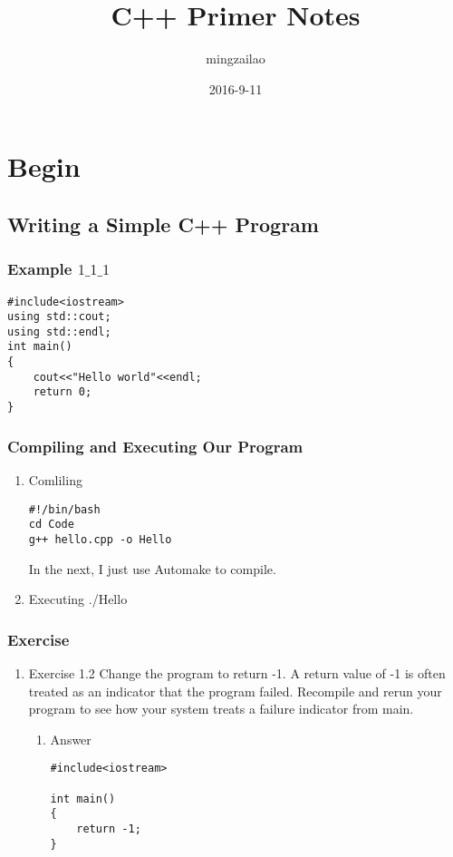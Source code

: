 \documentclass[11pt]{article}
\author{mingzailao}
\date{2016-9-11}
\title{C++ Primer Notes}
\begin{document}
\maketitle
\tableofcontents

\section{Begin}
\label{sec-1}
\subsection{Writing a Simple C++ Program}
\label{sec-1-1}
\subsubsection{Example $1\_1\_1$}
\label{sec-1-1-1}
\begin{verbatim}
#include<iostream>
using std::cout;
using std::endl;
int main()
{
    cout<<"Hello world"<<endl;
    return 0;
}
\end{verbatim}
\subsubsection{Compiling and Executing Our Program}
\label{sec-1-1-2}
\begin{enumerate}
\item Comliling
\label{sec-1-1-2-1}
\begin{verbatim}
#!/bin/bash
cd Code
g++ hello.cpp -o Hello
\end{verbatim}
In the next, I just use Automake to compile.

\item Executing
\label{sec-1-1-2-2}
./Hello
\end{enumerate}
\subsubsection{Exercise}
\label{sec-1-1-3}
\begin{enumerate}
\item Exercise 1.2
\label{sec-1-1-3-1}
Change the program to return -1. A return value of -1 is often treated as an indicator
that the program failed. Recompile and rerun your program to see how your system treats
a failure indicator from main.
\begin{enumerate}
\item Answer
\label{sec-1-1-3-1-1}
\begin{verbatim}
#include<iostream>

int main()
{
    return -1;
}
\end{verbatim}
\end{enumerate}
\end{enumerate}
\end{document}
